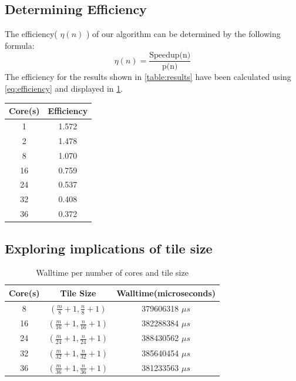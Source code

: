 \documentclass[manuscript,screen, nonacm=true]{acmart}
\begin{document}
\subsection{Determining Efficiency}
The efficiency( $\eta(n)$ ) of our algorithm can be determined by the following formula: 
\begin{equation}
    \eta(n) = \frac{\text{Speedup(n)}}{\text{p(n)}}
    \label{eq:efficiency}
\end{equation}
The efficiency for the results shown in \cref{table:results} have been calculated using \cref{eq:efficiency} and displayed in \cref{table:efficiency}. 

\begin{table}[!h]
    \begin{tabular}{||c|c||}
        \hline
        Core(s) & Efficiency \\ \hline
        1       & 1.572  \\ 
        \hline
        2       & 1.478 \\
        \hline
        8       & 1.070 \\
        \hline
        16      & 0.759 \\
        \hline
        24      & 0.537 \\
        \hline
        32      & 0.408 \\
        \hline
        36      & 0.372 \\
        \hline
    \end{tabular}
    \label{table:efficiency}
\end{table}



\subsection{Exploring implications of tile size}

\begin{table}[!h]
    \begin{tabular}{||c|c|c||}
        \hline
        Core(s) & Tile Size & Walltime(microseconds) \\ \hline
        8       &  $(\frac{m}{8} + 1, \frac{n}{8}+1)$  & 379606318 $\mu s$ \\ 
        \hline
        16       &  $(\frac{m}{16}+1, \frac{n}{16}+1)$  & 382288384 $\mu s$ \\
        \hline
        24       &  $(\frac{m}{24}+1, \frac{n}{24}+1)$  & 388430562 $\mu s$ \\
        \hline
        32     &  $(\frac{m}{32}+1, \frac{n}{32}+1)$ & 385640454 $\mu s$ \\
        \hline
        36      & $(\frac{m}{36}+1, \frac{n}{36}+1)$ & 381233563 $\mu s$ \\
        \hline
    \end{tabular}
    \label{table:tileresults}
    \caption{Walltime per number of cores and tile size}
\end{table}
\end{document}
